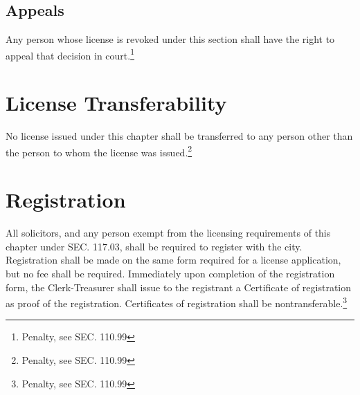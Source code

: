 \subsection{Appeals}
Any person whose license is revoked under this section shall have the right to appeal that decision in court.\footnote{Penalty, see SEC. 110.99}

\section{License Transferability}
No license issued under this chapter shall be transferred to any person other than the person to whom the license was issued.\footnote{Penalty, see SEC. 110.99}

\section{Registration}
All solicitors, and any person exempt from the licensing requirements of this chapter under SEC. 117.03, shall be required to register with the city. Registration shall be made on the same form required for a license application, but no fee shall be required. Immediately upon completion of the registration form, the Clerk-Treasurer shall issue to the registrant a Certificate of registration as proof of the registration. Certificates of registration shall be nontransferable.\footnote{Penalty, see SEC. 110.99}

